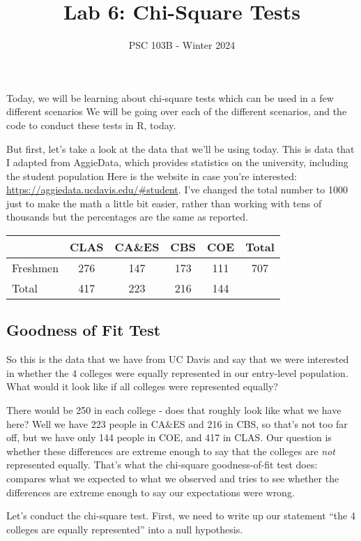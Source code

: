\documentclass[
  letterpaper,
  DIV=11,
  numbers=noendperiod]{scrartcl}
\title{Lab 6: Chi-Square Tests}
\subtitle{PSC 103B - Winter 2024}
\author{}
\date{}
\begin{document}
\maketitle

Today, we will be learning about chi-square tests which can be used in a
few different scenarios We will be going over each of the different
scenarios, and the code to conduct these tests in R, today.

But first, let's take a look at the data that we'll be using today. This
is data that I adapted from AggieData, which provides statistics on the
university, including the student population Here is the website in case
you're interested: \url{https://aggiedata.ucdavis.edu/\#student}. I've
changed the total number to 1000 just to make the math a little bit
easier, rather than working with tens of thousands but the percentages
are the same as reported.

\begin{longtable}[]{@{}lccccc@{}}
\toprule\noalign{}
& CLAS & CA\&ES & CBS & COE & Total \\
\midrule\noalign{}
\endhead
\bottomrule\noalign{}
\endlastfoot
Freshmen & 276 & 147 & 173 & 111 & 707 \\
Total & 417 & 223 & 216 & 144 & \\
\end{longtable}

\subsection{Goodness of Fit Test}\label{goodness-of-fit-test}

So this is the data that we have from UC Davis and say that we were
interested in whether the 4 colleges were equally represented in our
entry-level population. What would it look like if all colleges were
represented equally?

There would be 250 in each college - does that roughly look like what we
have here? Well we have 223 people in CA\&ES and 216 in CBS, so that's
not too far off, but we have only 144 people in COE, and 417 in CLAS.
Our question is whether these differences are extreme enough to say that
the colleges are \emph{not} represented equally. That's what the
chi-square goodness-of-fit test does: compares what we expected to what
we observed and tries to see whether the differences are extreme enough
to say our expectations were wrong.

Let's conduct the chi-square test. First, we need to write up our
statement ``the 4 colleges are equally represented'' into a null
hypothesis.
\end{document}
